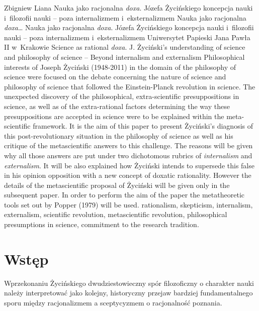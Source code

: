 \begin{artplenv}{Zbigniew Liana}
	{Nauka jako racjonalna \textit{doxa}. Józefa Życińskiego koncepcja nauki i~filozofii nauki -- poza internalizmem i~eksternalizmem}
	{Nauka jako racjonalna \textit{doxa}\ldots}
	{Nauka jako racjonalna \textit{doxa}. Józefa Życińskiego koncepcja nauki i~filozofii nauki -- poza internalizmem i~eksternalizmem}
	{Uniwersytet Papieski Jana Pawła II w~Krakowie}
	{Science as rational \textit{doxa}. J. Życiński's understanding of science and philosophy of science -- Beyond internalism and externalism}
	{Philosophical interests of Joseph Życiński (1948-2011) in the domain of the philosophy of science were focused on the
		debate concerning the nature of science and philosophy of science that followed the Einstein-Planck revolution in
		science. The unexpected discovery of the philosophical, extra-scientific  presuppositions in science, as well as of the
		extra-rational factors determining the way these presuppositions are accepted in science were to be explained within
		the meta-scientific framework. It is the aim of this paper to present Życiński's diagnosis of this post-revolutionary
		situation in the philosophy of science as well as his critique of the metascientific answers to this challenge. The
		reasons will be given why all those answers are put under two dichotomous rubrics of \textit{internalism} and
		\textit{externalism}. It will be also explained how Życiński intends to supersede this false in his opinion opposition
		with a new concept of doxatic rationality. However the details of the metascientific proposal of Życiński will be given
		only in the subsequent paper. In order to perform the aim of the paper the metatheoretic tools set out by Popper (1979)
		will be used.}
	{rationalism, skepticism, internalism, externalism, scientific revolution, metascientific revolution, philosophical
		presumptions in science, commitment to the research tradition.}


\section*{Wstęp}

\lettrine[loversize=0.13,lines=2,lraise=-0.05,nindent=0em,findent=0.2pt]%
{W}{}przekonaniu Życińskiego dwudziestowieczny spór filozoficzny o charakter nauki należy interpretować jako kolejny,
historyczny przejaw bardziej fundamentalnego sporu między racjonalizmem a sceptycyzmem o racjonalność poznania.


\end{artplenv}
